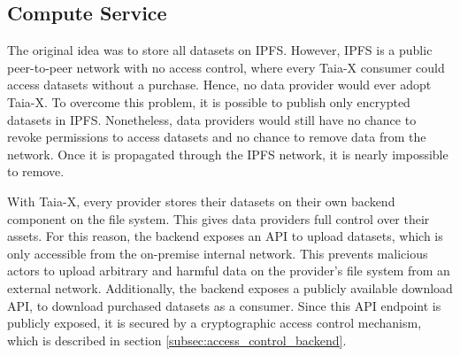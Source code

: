             
\subsection{Compute Service}
\label{subsec:compute}
        
The original idea was to store all datasets on IPFS. However, IPFS is a public peer-to-peer network with no access control, where every Taia-X consumer could access datasets without a purchase. Hence, no data provider would ever adopt Taia-X. To overcome this problem, it is possible to publish only encrypted datasets in IPFS. Nonetheless, data providers would still have no chance to revoke permissions to access datasets and no chance to remove data from the network. Once it is propagated through the IPFS network, it is nearly impossible to remove.
            
With Taia-X, every provider stores their datasets on their own backend component on the file system. This gives data providers full control over their assets. For this reason, the backend exposes an API to upload datasets, which is only accessible from the on-premise internal network. This prevents malicious actors to upload arbitrary and harmful data on the provider's file system from an external network. Additionally, the backend exposes a publicly available download API, to download purchased datasets as a consumer. Since this API endpoint is publicly exposed, it is secured by a cryptographic access control mechanism, which is described in section \ref{subsec:access_control_backend}.

